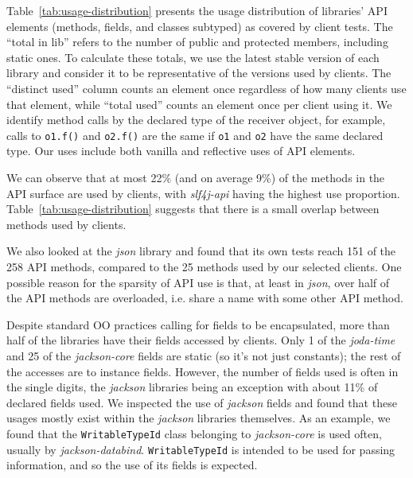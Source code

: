 Table~\ref{tab:usage-distribution} presents the usage distribution of
libraries' API elements (methods, fields, and classes subtyped) as
covered by client tests. The ``total in lib'' refers to the number of
public and protected members, including static ones. To calculate these totals,
we use the latest stable version of each library and consider it to be representative of 
the versions used by clients.  The ``distinct used'' column counts an
element once regardless of how many clients use that element, while
``total used'' counts an element once per client using it. We identify method calls by the
declared type of the receiver object, for example, calls to {\tt o1.f()} and {\tt o2.f()} are the same
if {\tt o1} and {\tt o2} have the same declared type.
Our uses 
include both vanilla and reflective uses of API elements.



We can observe that at most 22\% (and on average 9\%) of the methods in the API surface
are used by clients, with \emph{slf4j-api} having the highest use proportion.
Table~\ref{tab:usage-distribution} suggests that there is a small overlap between methods
used by clients.

We also looked at the \emph{json} library and found that its own tests reach 151
of the 258 API methods, compared to the 25 methods used by our selected
clients. One possible reason for the sparsity of API use is that, at least in \emph{json}, over half of the API methods are overloaded, i.e. share a name with
some other API method.

Despite standard OO practices calling for fields to be encapsulated, more than half of the libraries have their fields accessed by clients. Only 1 of the \emph{joda-time} and 25 of the \emph{jackson-core} fields are static (so it's not just constants); the rest of the accesses are to instance fields.
However, the number of fields used is often in the single digits,
the \emph{jackson} libraries being an exception with about 11\% of declared fields used.
We inspected the use of \emph{jackson} fields and found that these usages mostly exist within the \emph{jackson} libraries themselves.
As an example, we found that the {\tt WritableTypeId} class belonging to \emph{jackson-core} is used often, usually by \emph{jackson-databind}. 
{\tt WritableTypeId} is intended to be used for passing information, and so the use of its fields is expected.

